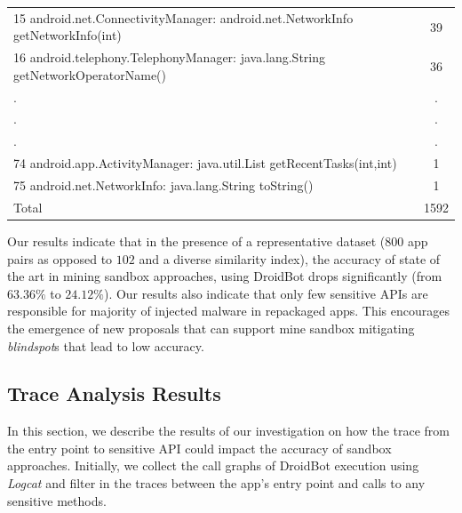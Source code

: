 \begin{table}[t]
\begin{tabular}{lc}
   15 android.net.ConnectivityManager: android.net.NetworkInfo getNetworkInfo(int) &  39 \\
   16 android.telephony.TelephonyManager: java.lang.String getNetworkOperatorName() &  36 \\
   .&  .\\
   .&  .\\
   .&  .\\
   74 android.app.ActivityManager: java.util.List getRecentTasks(int,int) & 1 \\
   75 android.net.NetworkInfo: java.lang.String toString() & 1 \\

 \bottomrule
                            Total & 1592 \\

 \end{tabular}
 \label{tab:APIused}
\end{table}

\begin{obs}{1}{}
   Our results indicate that in the presence of a representative dataset ($800$ app pairs as opposed to $102$ and a diverse similarity index), the accuracy of state of the art in mining sandbox approaches, using DroidBot drops significantly (from $63.36\%$ to $24.12\%$). Our results also indicate that only few sensitive APIs are responsible for majority of injected malware in repackaged apps. This encourages the emergence of new proposals that can support mine sandbox mitigating \textit{blindspot}s that lead to low accuracy.
 \end{obs}



\subsection{Trace Analysis Results}\label{sec:traceResults}

In this section, we describe the results of our investigation on how the trace from the entry point to sensitive API could impact the accuracy of sandbox approaches. Initially, we collect the call graphs of DroidBot execution using \emph{Logcat} and filter in the traces between the app's entry point and calls to any sensitive methods.

